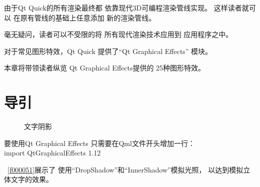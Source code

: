 ﻿





由于Qt Quick的所有渲染最终都
依靠现代3D可编程渲染管线实现。
这样读者就可以
在原有管线的基础上任意添加
新的渲染管线。

毫无疑问，读者可以不受限的将
所有现代渲染技术应用到
应用程序之中。

对于常见图形特效，Qt Quick
提供了“Qt Graphical Effects”
模块。

本章将带领读者纵览
Qt Graphical Effects提供的
25种图形特效。

\FloatBarrier
\section{
导引
}\label{c000015s000001}


\begin{figure}[htb] %
\marginnote{\setlength\fboxsep{2pt}\fbox{\footnotesize{\kaishu\figurename\,}\footnotesize{\ref{p000012}}}}\centering %
\setlength\fboxsep{0pt} %
\caption{文字阴影} %
\label{p000012} %
\end{figure}


要使用Qt Graphical Effects
只需要在Qml文件开头增加一行：\\
import QtGraphicalEffects 1.12

\filesourcenumbernameone\ \ref{f000051}展示了
使用“DropShadow”和“InnerShadow”模拟光照，
以达到模拟立体文字的效果。

